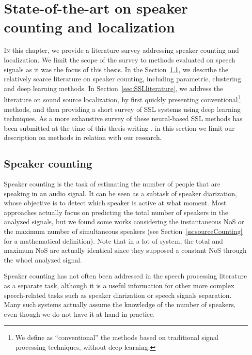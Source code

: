 \chapter{State-of-the-art on speaker counting and localization}
\label{chap:soa}

\lettrine{I}{n} this chapter, we provide a literature survey addressing speaker counting and localization. We limit the scope of the survey to methods evaluated on speech signals as it was the focus of this thesis. In the Section~\ref{sec:countingLiterature}, we describe the relatively scarce literature on speaker counting, including parametric, clustering and deep learning methods. In Section~\ref{sec:SSLliterature}, we address the literature on sound source localization, by first quickly presenting conventional\footnote{We define as ``conventional'' the methods based on traditional signal processing techniques, without deep learning.} methods, and then providing a short survey of SSL systems using deep learning techniques. As a more exhaustive survey of these neural-based SSL methods has been submitted at the time of this thesis writing \cite{grumiaux_survey_2021}, in this section we limit our description on methods in relation with our research. 

\section{Speaker counting}
\label{sec:countingLiterature}

Speaker counting is the task of estimating the number of people that are speaking in an audio signal. It can be seen as a subtask of speaker diarization, whose objective is to detect which speaker is active at what moment. Most approaches actually focus on predicting the total number of speakers in the analyzed signals, but we found some works considering the instantaneous NoS or the maximum number of simultaneous speakers (see Section~\ref{ss:sourceCounting} for a mathematical definition). Note that in a lot of system, the total and maximum NoS are actually identical since they supposed a constant NoS through the whoel analyzed signal. 

Speaker counting has not often been addressed in the speech processing literature as a separate task, although it is a useful information for other more complex speech-related tasks such as speaker diarization or speech signals separation. Many such systems actually assume the knowledge of the number of speakers, even though we do not have it at hand in practice.

